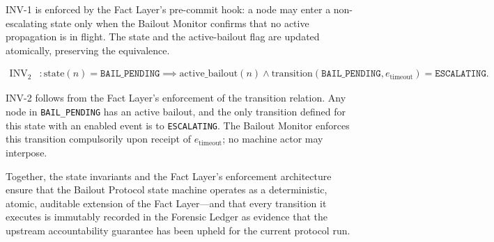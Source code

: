 INV-1 is enforced by the Fact Layer's pre-commit hook: a node may enter a non-escalating state only when the Bailout Monitor confirms that no active propagation is in flight. The state and the active-bailout flag are updated atomically, preserving the equivalence.

\begin{align}
\text{INV}_2 &: \text{state}(n) = \texttt{BAIL\_PENDING} \implies \text{active\_bailout}(n) \land \text{transition}(\texttt{BAIL\_PENDING}, e_{\text{timeout}}) = \texttt{ESCALATING}. \tag{INV-2}
\end{align}

INV-2 follows from the Fact Layer's enforcement of the transition relation. Any node in \texttt{BAIL\_PENDING} has an active bailout, and the only transition defined for this state with an enabled event is to \texttt{ESCALATING}. The Bailout Monitor enforces this transition compulsorily upon receipt of $e_{\text{timeout}}$; no machine actor may interpose.

Together, the state invariants and the Fact Layer's enforcement architecture ensure that the Bailout Protocol state machine operates as a deterministic, atomic, auditable extension of the Fact Layer---and that every transition it executes is immutably recorded in the Forensic Ledger as evidence that the upstream accountability guarantee has been upheld for the current protocol run.

